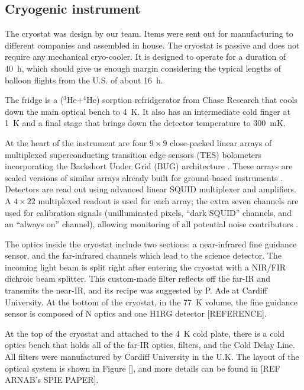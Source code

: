 \subsection{Cryogenic instrument}

The cryostat was design by our team. Items were sent out for manufacturing to different companies and assembled in house. The cryostat is passive and does not require any mechanical cryo-cooler. It is designed to operate for a duration of \SI{40}{\hour}, which should give us enough margin considering the typical lengths of balloon flights from the U.S. of about \SI{16}{\hour}. 

The fridge is a ($^3$He+$^4$He) sorption refridgerator from Chase Research that cools down the main optical bench to \SI{4}{\kelvin}. It also has an intermediate cold finger at \SI{1}{\kelvin} and a final stage that brings down the detector temperature to \SI{300}{\milli\kelvin}. 

At the heart of the instrument are four $9\times 9$ close-packed linear arrays of multiplexed superconducting transition edge sensors (TES) bolometers \citep{Benford:2008wk} incorporating the Backshort Under Grid (BUG) architecture \citep{Allen:2006jn}. These arrays are scaled versions of similar arrays already built for ground-based instruments \citep[e.g., GISMO,][]{Staguhn:2014jg}. Detectors are read out using advanced linear SQUID multiplexer and amplifiers. A $4\times 22$ multiplexed readout is used for each array; the extra seven channels are used for calibration signals (unilluminated pixels, “dark SQUID” channels, and an “always on” channel), allowing monitoring of all potential noise contributors \citep{deKorte:2003km}.  

The optics inside the cryostat include two sections: a near-infrared fine guidance sensor, and the far-infrared channels which lead to the science detector. The incoming light beam is split right after entering the cryostat with a NIR/FIR dichroic beam splitter. This custom-made filter reflects off the far-IR and transmits the near-IR, and its recipe was suggested by P. Ade at Cardiff University. At the bottom of the cryostat, in the \SI{77}{\kelvin} volume, the fine guidance sensor is composed of N optics and one H1RG detector [REFERENCE]. 

At the top of the cryostat and attached to the \SI{4}{\kelvin} cold plate, there is a cold optics bench that holds all of the far-IR optics, filters, and the Cold Delay Line. All filters were manufactured by Cardiff University in the U.K. The layout of the optical system is shown in Figure [], and more details can be found in [REF ARNAB's SPIE PAPER].



